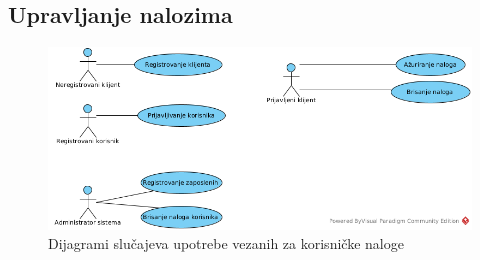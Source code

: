 \subsection{Upravljanje nalozima}

\begin{figure}[H]
\begin{center}
\includegraphics[width=\textwidth]{Pictures/uc_user_accounts.png}
\end{center}
    \caption{Dijagrami slučajeva upotrebe vezanih za korisničke naloge}
\label{fig:UCUserAccounts}
\end{figure}






